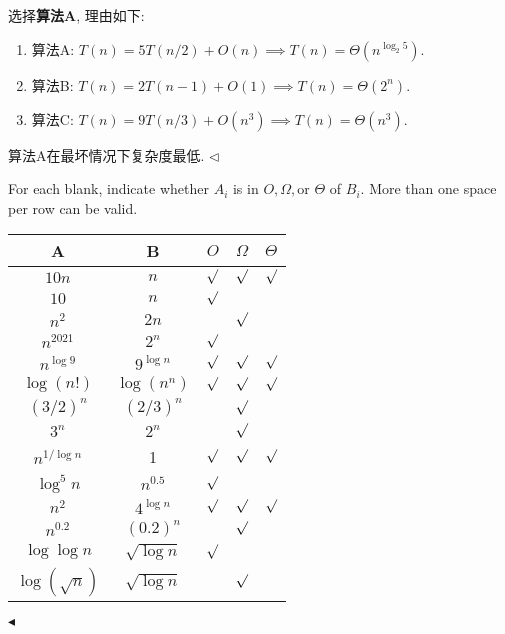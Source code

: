 \documentclass[11pt]{article}
\newenvironment{problem}[2][Problem]{\begin{trivlist}
\item[\hskip \labelsep{\bfseries#1}\hskip\labelsep{\bfseries#2.}]}{\hfill$\blacktriangleleft$\end{trivlist}}
\newenvironment{answer}[1][Answer]{\begin{trivlist}
\item[\hskip \labelsep{\bfseries\itshape#1.}\hskip \labelsep]}{\hfill$\lhd$\end{trivlist}}
\begin{document}
\begin{answer}
    选择\textbf{算法A}, 理由如下:
    \begin{enumerate}
        \item 算法A: $T(n) = 5T(n/2) + O(n) \implies T(n) = \Theta(n^{\log_2 5})$.
        \item 算法B: $T(n) = 2T(n-1) + O(1) \implies T(n) = \Theta(2^n) $.
        \item 算法C: $T(n) = 9T(n/3) + O(n^3) \implies T(n) = \Theta(n^3)$.
    \end{enumerate}
    算法A在最坏情况下复杂度最低.
\end{answer}

\begin{problem}{4 (Complexity Bounds)}
    For each blank, indicate whether $A_i$ is in $O, \Omega,$or $ \Theta$ of $B_i$. More than one space per row can be valid.
    \begin{center}
        \begin{tabular}{|c|c|c|c|c|}
            \hline
            \textbf{A} & \textbf{B} & $O$ & $\Omega$ & $\Theta$ \\
            \hline
            $10 n$ & $n$ & $\surd$ & $\surd$ & $\surd$ \\
            \hline
            $10$ & $n$ &$\surd$ &  & \\
            \hline
            $n^2$ & $2n$ & & $\surd$ & \\
            \hline
            $n^{2021}$ & $2^n$ & $\surd$ &  & \\
            \hline
            $n ^ {\log 9}$ & $9^{\log n}$ & $\surd$ & $\surd$ & $\surd$ \\
            \hline
            $\log(n!)$ & $\log(n^n)$ & $\surd$ & $\surd$ & $\surd$ \\
            \hline
            $(3/2)^n$ & $(2/3)^n$ & & $\surd$ & \\
            \hline
            $3^n$ & $2^n$ &  & $\surd$ & \\
            \hline
            $n ^ {1/ \log n}$ & 1 & $\surd$ & $\surd$ & $\surd$ \\
            \hline
            $\log^5 n$ & $n^{0.5}$ & $\surd$ &  & \\
            \hline
            $n^2$ & $4^{\log n}$ & $\surd$ & $\surd$ & $\surd$\\
            \hline
            $n^{0.2}$ & $(0.2)^n$ & & $\surd$ & \\
            \hline
            $\log \log n$ & $\sqrt{\log n}$ & $\surd$ &  & \\
            \hline
            $\log(\sqrt{n})$ & $\sqrt{\log n}$ & & $\surd$ & \\
            \hline
        \end{tabular}
    \end{center}
\end{problem}
\end{document}
